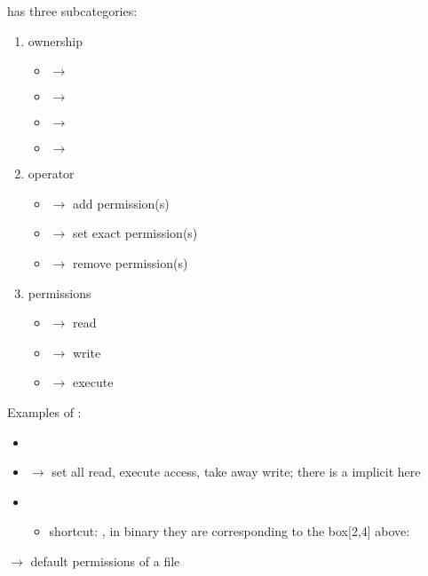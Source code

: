  has three subcategories:
\begin{enumerate}
    \item ownership
          \begin{itemize}
              \item {} $ \rightarrow $ 
              \item {} $ \rightarrow $ 
              \item {} $ \rightarrow $ 
              \item {} $ \rightarrow $ 
          \end{itemize}
    \item operator
          \begin{itemize}
              \item \code{+} $ \rightarrow $ add permission(s)
              \item \code{=} $ \rightarrow $ set exact permission(s)
              \item \code{-} $ \rightarrow $ remove permission(s)
          \end{itemize}
    \item permissions
          \begin{itemize}
              \item {} $ \rightarrow $ read
              \item {} $ \rightarrow $ write
              \item {} $ \rightarrow $ execute
          \end{itemize}
\end{enumerate}
Examples of :
\begin{itemize}
    \item {}
    \item {} $ \rightarrow $ set all read, execute access,
          take away write; there is a implicit  here
    \item {}
          \begin{itemize}
              \item shortcut: , in binary they are corresponding
                    to the box[2,4] above: 
          \end{itemize}
\end{itemize}

 $ \rightarrow $ default permissions of a file

